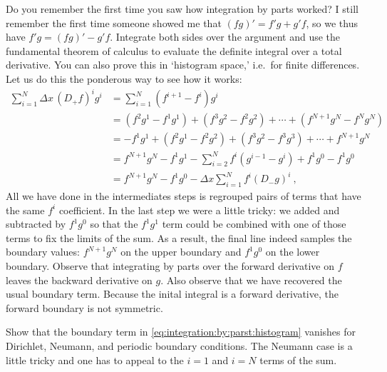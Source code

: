\documentclass[12pt, oneside]{report}    %
\begin{document}
\begin{example}
Do you remember the first time you saw how integration by parts worked? I still remember the first time someone showed me that $(fg)' = f'g + g'f$, so we thus have $f'g = (fg)' - g'f$. Integrate both sides over the argument and use the fundamental theorem of calculus to evaluate the definite integral over a total derivative. You can also prove this in `histogram space,' i.e.\ for finite differences. Let us do this the ponderous way to see how it works:
\begin{align}
    \sum_{i=1}^N\Delta x\, (D_+f)^i g^i
    &= \sum_{i=1}^N \left(f^{i+1}-f^{i}\right)g^i
    \\
    &= \left(f^2 g^1 - f^1 g^1\right) 
        + \left(f^3 g^2 - f^2 g^2\right) 
        + \cdots
        + \left(f^{N+1} g^N - f^N g^N\right) 
    \\
    &=  - f^1 g^1 
        + \left(f^2 g^1 - f^2 g^2 \right) 
        + \left(f^3 g^2 - f^3 g^3 \right) 
        + \cdots
        + f^{N+1} g^N
    \\
    &= f^{N+1} g^N -  f^1 g^1   -\sum_{i=2}^N f^i\left(g^{i-1} - g^i \right)
    + f^1g^0 - f^1g^0
    \\
    &= f^{N+1} g^N -  f^1 g^0   -\Delta x\sum_{i=1}^N f^i (D_-g)^i \ ,
    \label{eq:integration:by:parst:histogram}
\end{align}
All we have done in the intermediates steps is regrouped pairs of terms that have the same $f^i$ coefficient. In the last step we were a little tricky: we added and subtracted by $f^1g^0$ so that the $f^1g^1$ term could be combined with one of those terms to fix the limits of the sum. As a result, the final line indeed samples the boundary values: $f^{N+1}g^N$ on the upper boundary and $f^1g^0$ on the lower boundary. Observe that integrating by parts over the forward derivative on $f$ leaves the backward derivative on $g$. Also observe that we have recovered the usual boundary term. Because the inital integral is a forward derivative, the forward boundary is not symmetric. 
\end{example}

\begin{exercise}
Show that the boundary term in \eqref{eq:integration:by:parst:histogram} vanishes for Dirichlet, Neumann, and periodic boundary conditions. The Neumann case is a little tricky and one has to appeal to the $i=1$ and $i=N$ terms of the sum. 
\end{exercise}
\end{document}
